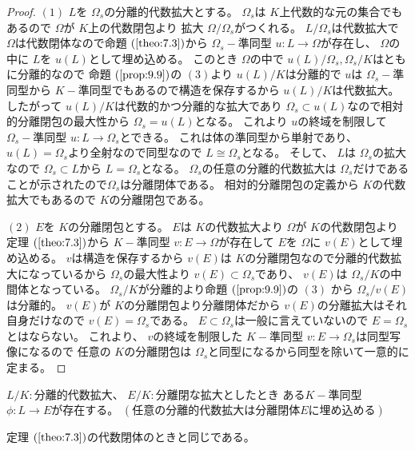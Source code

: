 \documentclass[../master_galois_theory]{subfiles}
\begin{document}
\begin{proof}
  $(1)$
  $L$を $\Omega_s$の分離的代数拡大とする。
  $\Omega_s$は $K$上代数的な元の集合でもあるので
  $\Omega$が $K$上の代数閉包より 拡大 $\Omega/\Omega_s$がつくれる。
  $L/\Omega_s$は代数拡大で $\Omega$は代数閉体なので命題 $(\mathrm{\ref{theo:7.3}})$から
  $\Omega_s-$準同型 $u : L \longrightarrow \Omega$が存在し、
  $\Omega$の中に $L$を $u(L)$として埋め込める。
  このとき $\Omega$の中で
  $u(L)/\Omega_s , \Omega_s/K$はともに分離的なので
  命題 $(\mathrm{\ref{prop:9.9}})$の $(3)$より
  $u(L)/K$は分離的で $u$は $\Omega_s-$準同型から
  $K-$準同型でもあるので構造を保存するから $u(L)/K$は代数拡大。
  したがって $u(L)/K$は代数的かつ分離的な拡大であり $\Omega_s \subset u(L)$なので相対的分離閉包の最大性から $\Omega_s = u(L)$となる。
  これより $u$の終域を制限して $\Omega_s-$準同型 $u:L \longrightarrow \Omega_s$とできる。
  これは体の準同型から単射であり、 $u(L) = \Omega_s$より全射なので同型なので
  $L \cong \Omega_s$となる。
  そして、 $L$は $\Omega_s$の拡大なので $\Omega_s \subset L$から
  $L = \Omega_s$となる。
  $\Omega_s$の任意の分離的代数拡大は $\Omega_s$だけであることが示されたので$\Omega_s$は分離閉体である。
  相対的分離閉包の定義から $K$の代数拡大でもあるので $K$の分離閉包である。

  $(2)$
  $E$を $K$の分離閉包とする。
  $E$は $K$の代数拡大より $\Omega$が $K$の代数閉包より
  定理 $(\mathrm{\ref{theo:7.3}})$から
  $K-$準同型 $v:E \longrightarrow \Omega$が存在して
  $E$を $\Omega$に $v(E)$として埋め込める。
  $v$は構造を保存するから $v(E)$は $K$の分離閉包なので分離的代数拡大になっているから $\Omega_s$の最大性より $v(E) \subset \Omega_s$であり、
  $v(E)$は $\Omega_s/K$の中間体となっている。
  $\Omega_s/K$が分離的より命題 $(\mathrm{\ref{prop:9.9}})$の $(3)$
  から $\Omega_s/v(E)$は分離的。
  $v(E)$が $K$の分離閉包より分離閉体だから $v(E)$の分離拡大はそれ自身だけなので $v(E) = \Omega_s$である。
  $E \subset \Omega_s$は一般に言えていないので $E = \Omega_s$とはならない。
  これより、 $v$の終域を制限した $K-$準同型 $v:E \longrightarrow \Omega_s$は同型写像になるので
  任意の $K$の分離閉包は $\Omega_s$と同型になるから同型を除いて一意的に定まる。
\end{proof}

\begin{corl}
  $L/K:$分離的代数拡大、 $E/K:$分離閉な拡大としたとき
  ある$K-$準同型 $\phi:L \longrightarrow E$が存在する。
  $(任意の分離的代数拡大は分離閉体 E に埋め込める)$

  定理 $(\mathrm{\ref{theo:7.3}})$の代数閉体のときと同じである。
\end{corl}
\end{document}

